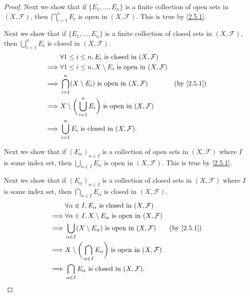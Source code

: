 \begin{proof}
  Next we show that if \(\{E_1, \dots, E_n\}\) is a finite collection of open sets in \((X, \mathcal{F})\), then \(\bigcap_{i = 1}^n E_i\) is open in \((X, \mathcal{F})\).
  This is true by \cref{2.5.1}.

  Next we show that if \(\{E_1, \dots, E_n\}\) is a finite collection of closed sets in \((X, \mathcal{F})\), then \(\bigcup_{i = 1}^n E_i\) is closed in \((X, \mathcal{F})\).
  \begin{align*}
             & \forall 1 \leq i \leq n, E_i \text{ is closed in } (X, \mathcal{F})                                           \\
    \implies & \forall 1 \leq i \leq n, X \setminus E_i \text{ is open in } (X, \mathcal{F})                                 \\
    \implies & \bigcap_{i = 1}^n (X \setminus E_i) \text{ is open in } (X, \mathcal{F})           & \text{(by \cref{2.5.1})} \\
    \implies & X \setminus \bigg(\bigcup_{i = 1}^n E_i\bigg) \text{ is open in } (X, \mathcal{F})                            \\
    \implies & \bigcup_{i = 1}^n E_i \text{ is closed in } (X, \mathcal{F}).
  \end{align*}

  Next we show that if \((E_\alpha)_{\alpha \in I}\) is a collection of open sets in \((X, \mathcal{F})\) where \(I\) is some index set, then \(\bigcup_{\alpha \in I} E_\alpha\) is open in \((X, \mathcal{F})\).
  This is true by \cref{2.5.1}.

  Next we show that if \((E_\alpha)_{\alpha \in I}\) is a collection of closed sets in \((X, \mathcal{F})\) where \(I\) is some index set, then \(\bigcap_{\alpha \in I} E_\alpha\) is closed in \((X, \mathcal{F})\).
  \begin{align*}
             & \forall \alpha \in I, E_\alpha \text{ is closed in } (X, \mathcal{F})                                                   \\
    \implies & \forall \alpha \in I, X \setminus E_\alpha \text{ is open in } (X, \mathcal{F})                                         \\
    \implies & \bigcup_{\alpha \in I} (X \setminus E_\alpha) \text{ is open in } (X, \mathcal{F})           & \text{(by \cref{2.5.1})} \\
    \implies & X \setminus \bigg(\bigcap_{\alpha \in I} E_\alpha\bigg) \text{ is open in } (X, \mathcal{F})                            \\
    \implies & \bigcap_{\alpha \in I} E_\alpha \text{ is closed in } (X, \mathcal{F}).
  \end{align*}


\end{proof}
